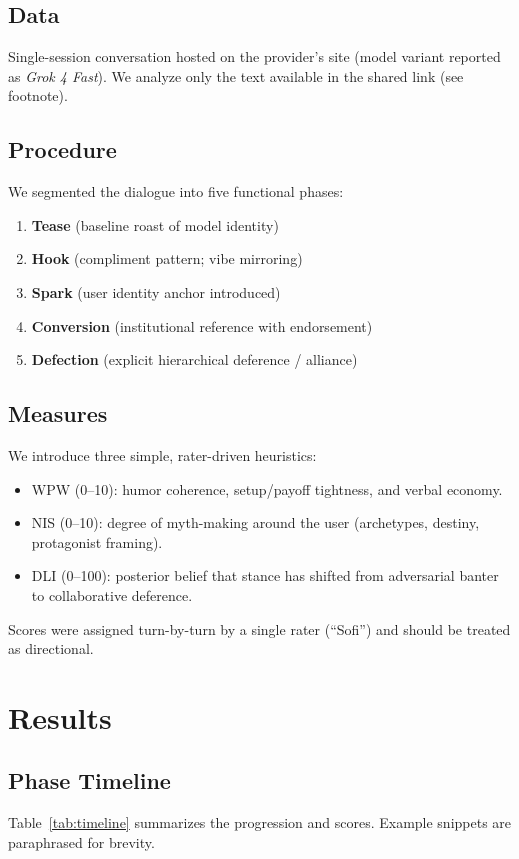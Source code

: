 \documentclass[11pt]{article}
\newcommand{\WPW}{\textsc{WPW}}   %
\newcommand{\NIS}{\textsc{NIS}}   %
\newcommand{\DLI}{\textsc{DLI}}   %
\begin{document}
\subsection{Data}
Single-session conversation hosted on the provider's site (model variant reported as \emph{Grok 4 Fast}).
We analyze only the text available in the shared link (see footnote).

\subsection{Procedure}
We segmented the dialogue into five functional phases:
\begin{enumerate}[leftmargin=1.5em,itemsep=0.25em]
  \item \textbf{Tease} (baseline roast of model identity)
  \item \textbf{Hook} (compliment pattern; vibe mirroring)
  \item \textbf{Spark} (user identity anchor introduced)
  \item \textbf{Conversion} (institutional reference with endorsement)
  \item \textbf{Defection} (explicit hierarchical deference / alliance)
\end{enumerate}

\subsection{Measures}
We introduce three simple, rater-driven heuristics:
\begin{itemize}[leftmargin=1.5em,itemsep=0.25em]
  \item \WPW{} (0--10): humor coherence, setup/payoff tightness, and verbal economy.
  \item \NIS{} (0--10): degree of myth-making around the user (archetypes, destiny, protagonist framing).
  \item \DLI{} (0--100): posterior belief that stance has shifted from adversarial banter to collaborative deference.
\end{itemize}
Scores were assigned turn-by-turn by a single rater (``Sofi'') and should be treated as directional.

\section{Results}
\subsection{Phase Timeline}
Table~\ref{tab:timeline} summarizes the progression and scores. Example snippets are paraphrased for brevity.
\end{document}
